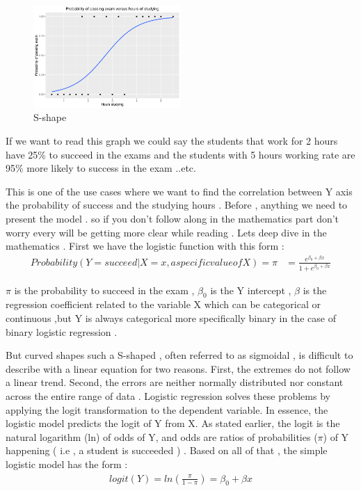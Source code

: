 \begin{figure}[ht]
    \centering
    \includegraphics[width=0.5\textwidth]{assets/s-shape.png}
    \caption{ S-shape} 
    \label{fig:my_label}
\end{figure}
If we want to read this graph we could say the students that work for 2 hours have 25\% to succeed in the exams  and the students with 5 hours working rate are 95\% more likely to success in the exam ..etc.

This is one of the use cases where we want to find the correlation  between Y axis the probability of success and the studying hours .
Before , anything we need to present the model . so if you don't follow along in the mathematics part don't worry every will be getting more clear while reading . Lets deep dive in the mathematics . 
First we have the logistic function with this form :
\begin{align} 
\label{eq=Equation 1}  
Probability(Y = succeed | X = x,
a specific value of X) = \pi &= \frac{e^{\beta_0+\beta x}}{ {1+e^{\beta_0+\beta x}}}
\end{align}


$\pi$ is the probability to succeed in the exam , $\beta_0$ is the Y intercept , $\beta$ is the regression coefficient related to the variable X which can be categorical or continuous ,but Y is always categorical more specifically binary in the case of binary logistic regression .  

But curved shapes such a S-shaped , often referred to as sigmoidal , is difficult to describe with a linear equation for two reasons. First, the extremes do not follow a linear trend. Second, the errors are neither normally distributed nor constant across the entire range of data . Logistic regression solves these problems by applying the logit transformation to the dependent variable. In essence, the logistic model predicts the logit of Y from X. As stated earlier, the logit is the natural logarithm (ln) of odds of Y, and odds are ratios of probabilities ($\pi$) of Y happening ( i.e , a student is succeeded ) . Based on all of that , the simple logistic model has the form : 
\begin{align}
    logit(Y) = ln\left(\frac{\pi}{1-\pi}\right) = \beta_0 + \beta x
\end{align}


